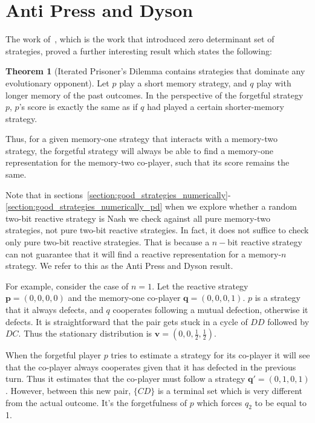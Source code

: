 \documentclass{article}
\theoremstyle{definition}
\newtheorem{theorem}{Theorem}[section]
\begin{document}
\section{Anti Press and Dyson}

The work of~\citep{press:PNAS:2012}, which is the work that introduced
zero determinant set of strategies, proved a further interesting result which
states the following:

\begin{theorem}[Iterated Prisoner's Dilemma contains strategies that dominate any evolutionary opponent]
  Let \(p\) play a short memory strategy, and \(q\) play with longer memory of
  the past outcomes. In the perspective of the forgetful strategy \(p\), \(p\)'s
  score is exactly the same as if \(q\) had played a certain shorter-memory
  strategy.
\end{theorem}

Thus, for a given memory-one strategy that interacts with a memory-two strategy,
the forgetful strategy will always be able to find a memory-one representation
for the memory-two co-player, such that its score remains the same.

Note that in sections~\ref{section:good_strategies_numerically}-
\ref{section:good_strategies_numerically_pd} when we explore whether a random
two-bit reactive strategy is Nash we check against all pure memory-two
strategies, not pure two-bit reactive strategies. In fact, it does not
suffice to check only pure two-bit reactive strategies.
That is because a \(n-\)bit reactive strategy can not guarantee that it will
find a reactive representation for a memory-\(n\) strategy. We refer to this
as the Anti Press and Dyson result.

For example, consider the case of \(n=1\). Let the reactive strategy
\(\mathbf{p} = (0, 0, 0, 0)\) and the memory-one co-player \(\mathbf{q} = (0, 0,
0, 1)\). \(p\) is a strategy that it always defects, and \(q\) cooperates
following a mutual defection, otherwise it defects. It is straightforward that
the pair gets stuck in a cycle of \(DD\) followed by \(DC\). Thus the stationary
distribution is \(\mathbf{v} = (0, 0, \frac{1}{2}, \frac{1}{2})\).

When the forgetful player \(p\) tries to estimate a strategy for its co-player
it will see that the co-player always cooperates given that it has defected in
the previous turn. Thus it estimates that the co-player must follow a strategy
\(\mathbf{q'} = (0, 1, 0, 1)\). However, between this new pair, \(\{CD\}\) is a
terminal set which is very different from the actual outcome. It's the
forgetfulness of \(p\) which forces \(q_2\) to be equal to 1.
\end{document}
